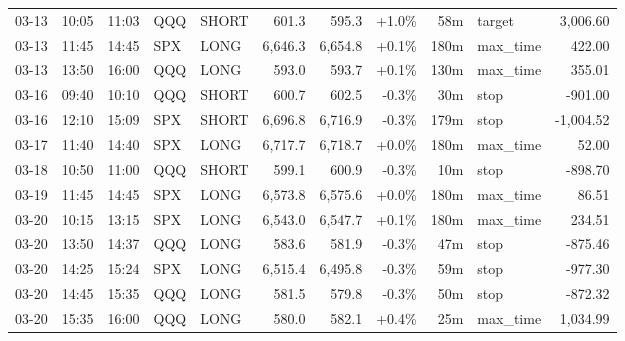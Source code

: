 \documentclass[11pt,a4paper,twoside]{article}
\begin{document}
\begin{center}
\begin{longtable}{>{\color{txtmain}}l l l l l r r r r >{\color{txtmain}}l r}
03-13 & 10:05 & 11:03 & QQQ & SHORT & 601.3 & 595.3 & \textcolor{wingreen}{+1.0\%} & 58m & target & \textcolor{wingreen}{3,006.60} \\
03-13 & 11:45 & 14:45 & SPX & LONG & 6,646.3 & 6,654.8 & \textcolor{wingreen}{+0.1\%} & 180m & max\_time & \textcolor{wingreen}{422.00} \\
03-13 & 13:50 & 16:00 & QQQ & LONG & 593.0 & 593.7 & \textcolor{wingreen}{+0.1\%} & 130m & max\_time & \textcolor{wingreen}{355.01} \\
03-16 & 09:40 & 10:10 & QQQ & SHORT & 600.7 & 602.5 & \textcolor{lossred}{-0.3\%} & 30m & stop & \textcolor{lossred}{-901.00} \\
03-16 & 12:10 & 15:09 & SPX & SHORT & 6,696.8 & 6,716.9 & \textcolor{lossred}{-0.3\%} & 179m & stop & \textcolor{lossred}{-1,004.52} \\
03-17 & 11:40 & 14:40 & SPX & LONG & 6,717.7 & 6,718.7 & \textcolor{wingreen}{+0.0\%} & 180m & max\_time & \textcolor{wingreen}{52.00} \\
03-18 & 10:50 & 11:00 & QQQ & SHORT & 599.1 & 600.9 & \textcolor{lossred}{-0.3\%} & 10m & stop & \textcolor{lossred}{-898.70} \\
03-19 & 11:45 & 14:45 & SPX & LONG & 6,573.8 & 6,575.6 & \textcolor{wingreen}{+0.0\%} & 180m & max\_time & \textcolor{wingreen}{86.51} \\
03-20 & 10:15 & 13:15 & SPX & LONG & 6,543.0 & 6,547.7 & \textcolor{wingreen}{+0.1\%} & 180m & max\_time & \textcolor{wingreen}{234.51} \\
03-20 & 13:50 & 14:37 & QQQ & LONG & 583.6 & 581.9 & \textcolor{lossred}{-0.3\%} & 47m & stop & \textcolor{lossred}{-875.46} \\
03-20 & 14:25 & 15:24 & SPX & LONG & 6,515.4 & 6,495.8 & \textcolor{lossred}{-0.3\%} & 59m & stop & \textcolor{lossred}{-977.30} \\
03-20 & 14:45 & 15:35 & QQQ & LONG & 581.5 & 579.8 & \textcolor{lossred}{-0.3\%} & 50m & stop & \textcolor{lossred}{-872.32} \\
03-20 & 15:35 & 16:00 & QQQ & LONG & 580.0 & 582.1 & \textcolor{wingreen}{+0.4\%} & 25m & max\_time & \textcolor{wingreen}{1,034.99} \\
\end{longtable}
\end{center}
\clearpage
\end{document}
